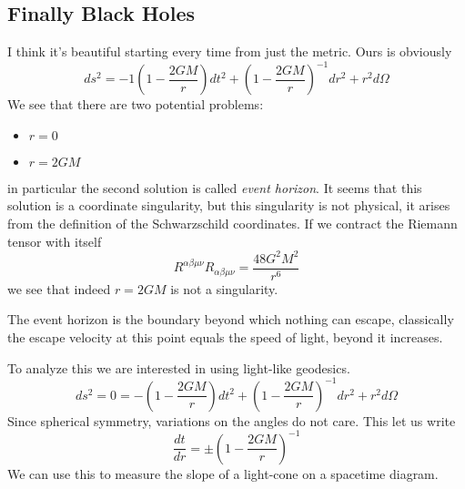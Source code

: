 \subsection{Finally Black Holes}

I think it's beautiful starting every time from just the metric. Ours is obviously
\[
ds^{2} = - 1 \left( 1- \frac{2GM}{r} \right)dt^{2} + \left( 1- \frac{2GM}{r} \right)^{-1} dr^{2} + r^{2}d\Omega 
\]
We see that there are two potential problems:
\begin{itemize}
\item $r = 0$
\item $r = 2GM$
\end{itemize}
in particular the second solution is called \emph{event horizon}. It seems that this solution is a coordinate singularity, but this singularity is not physical, it arises from the definition of the Schwarzschild coordinates.
If we contract the Riemann tensor with itself
\[
R^{\alpha \beta \mu \nu }R_{\alpha \beta \mu \nu } = \frac{48G^{2}M^{2}}{r^{6}}
\]
we see that indeed $r= 2GM$ is not a singularity.\par

The event horizon is the boundary beyond which nothing can escape, classically the escape velocity at this point equals the speed of light, beyond it increases.\par
To analyze this we are interested in using light-like geodesics.
\begin{equation}
ds^{2} = 0 = -\left( 1- \frac{2GM}{r} \right)dt^{2} + \left( 1 - \frac{2GM}{r} \right)^{-1}dr^{2} + r^{2}d\Omega 
\end{equation}
Since spherical symmetry, variations on the angles do not care. This let us write
\begin{equation}
\frac{d t}{d r} = \pm \left( 1- \frac{2GM}{r} \right)^{-1}
\end{equation}
We can use this to measure the slope of a light-cone on a spacetime diagram.





















